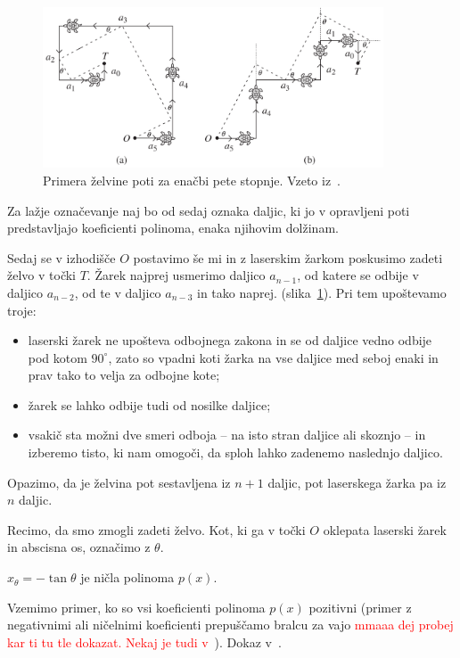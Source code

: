 \begin{figure}[h]
    \centering
    \includegraphics[width=0.9\textwidth]{images/kubična enačba/primera_zelvine_poti.png}
    \caption[Primera želvine poti]{Primera želvine poti za enačbi pete stopnje. Vzeto iz~\cite[str.\ 311]{hull2011}.}
    \label{fig:primera_zelve}
\end{figure}

Za lažje označevanje naj bo od sedaj oznaka daljic, ki jo v opravljeni poti predstavljajo koeficienti polinoma, enaka njihovim dolžinam.

Sedaj se v izhodišče $O$ postavimo še mi in z laserskim žarkom poskusimo zadeti želvo v točki $T$. Žarek najprej usmerimo daljico $a_{n-1}$, od katere se odbije v daljico $a_{n-2}$, od te v daljico $a_{n-3}$ in tako naprej. (slika~\ref{fig:primera_zelve}). Pri tem upoštevamo troje:
\begin{itemize}
    \item laserski žarek ne upošteva odbojnega zakona in se od daljice vedno odbije pod kotom $90^\circ$, zato so vpadni koti žarka na vse daljice med seboj enaki in prav tako to velja za odbojne kote;
    \item žarek se lahko odbije tudi od nosilke daljice;
    \item vsakič sta možni dve smeri odboja -- na isto stran daljice ali skoznjo -- in izberemo tisto, ki nam omogoči, da sploh lahko zadenemo naslednjo daljico.
\end{itemize}
Opazimo, da je želvina pot sestavljena iz $n+1$ daljic, pot laserskega žarka pa iz $n$ daljic.

Recimo, da smo zmogli zadeti želvo. Kot, ki ga v točki $O$ oklepata laserski žarek in abscisna os, označimo z $\theta$.

\begin{trditev}
    $x_{\theta} = - \tan \theta$ je ničla polinoma $p(x)$.
\end{trditev}

\begin{dokaz}
    Vzemimo primer, ko so vsi koeficienti polinoma $p(x)$ pozitivni (primer z negativnimi ali ničelnimi koeficienti prepuščamo bralcu za vajo \textcolor{red}{mmaaa dej probej kar ti tu tle dokazat. Nekaj je tudi v~\cite[str.\ 36]{zore2020}}).
    Dokaz v~\cite[str.\ 312]{hull2011}.
\end{dokaz}

